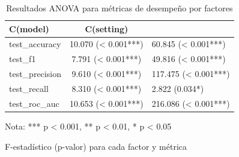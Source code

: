 \begin{table}[htbp]
\centering
\caption{Resultados ANOVA para métricas de desempeño por factores}
\label{tab:anova_metrics}
\begin{tabular}{lc}
\toprule
C(model) & C(setting) \\
\midrule
test\_accuracy & 10.070 (< 0.001***) & 60.845 (< 0.001***) \\
test\_f1 & 7.791 (< 0.001***) & 49.816 (< 0.001***) \\
test\_precision & 9.610 (< 0.001***) & 117.475 (< 0.001***) \\
test\_recall & 8.310 (< 0.001***) & 2.822 (0.034*) \\
test\_roc\_auc & 10.653 (< 0.001***) & 216.086 (< 0.001***) \\
\bottomrule
\end{tabular}
\begin{tablenotes}
\small
\item Nota: *** p < 0.001, ** p < 0.01, * p < 0.05
\item F-estadístico (p-valor) para cada factor y métrica
\end{tablenotes}
\end{table}
